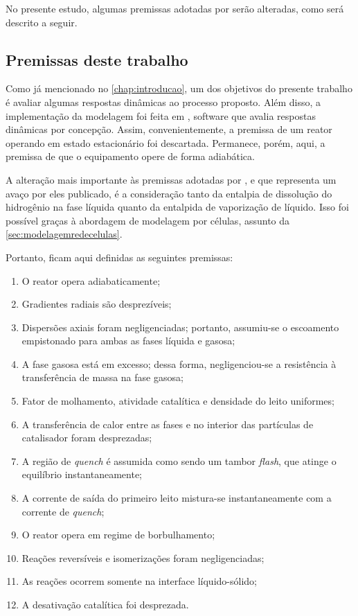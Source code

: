 No presente estudo, algumas premissas adotadas por  serão
alteradas, como será descrito a seguir. 

\subsection{Premissas deste trabalho} \label{sec:premissasdestetrabalho}

Como já mencionado no \autoref{chap:introducao}, um dos objetivos do presente
trabalho é avaliar algumas respostas dinâmicas ao processo proposto. Além disso,
a implementação da modelagem foi feita em \emso, software que avalia respostas
dinâmicas por concepção. Assim, convenientemente, a premissa de um reator
operando em estado estacionário foi descartada. Permanece, porém, aqui, a
premissa de que o equipamento opere de forma adiabática.

A alteração mais importante às premissas adotadas por , e
que representa um avaço por eles publicado, é a consideração tanto da entalpia
de dissolução do hidrogênio na fase líquida quanto da entalpida de vaporização
de líquido. Isso foi possível graças à abordagem de modelagem por células,
assunto da \autoref{sec:modelagemredecelulas}.

Portanto, ficam aqui definidas as seguintes premissas:

\begin{enumerate}
  \item O reator opera adiabaticamente;
  \item Gradientes radiais são desprezíveis;
  \item Dispersões axiais foram negligenciadas; portanto, assumiu-se o
  escoamento empistonado para ambas as fases líquida e gasosa;
  \item A fase gasosa está em excesso; dessa forma, negligenciou-se a
  resistência à transferência de massa na fase gasosa;
  \item Fator de molhamento, atividade catalítica e densidade do leito
  uniformes;
  \item A transferência de calor entre as fases e no interior das partículas de
  catalisador foram desprezadas;
  \item A região de \emph{quench} é assumida como sendo um tambor \emph{flash},
  que atinge o equilíbrio instantaneamente;
  \item A corrente de saída do primeiro leito mistura-se instantaneamente com a
  corrente de \emph{quench};
  \item O reator opera em regime de borbulhamento;
  \item Reações reversíveis e isomerizações foram negligenciadas;
  \item As reações ocorrem somente na interface líquido-sólido;
  \item A desativação catalítica foi desprezada.
\end{enumerate}

